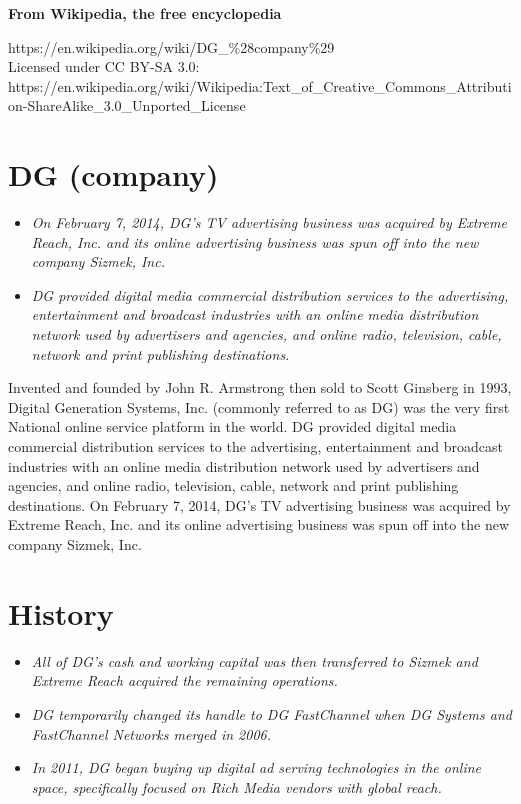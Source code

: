 \textbf{From Wikipedia, the free encyclopedia}

https://en.wikipedia.org/wiki/DG\_\%28company\%29\\
Licensed under CC BY-SA 3.0:\\
https://en.wikipedia.org/wiki/Wikipedia:Text\_of\_Creative\_Commons\_Attribution-ShareAlike\_3.0\_Unported\_License

\section{DG (company)}\label{dg-company}

\begin{itemize}
\item
  \emph{On February 7, 2014, DG's TV advertising business was acquired
  by Extreme Reach, Inc. and its online advertising business was spun
  off into the new company Sizmek, Inc.}
\item
  \emph{DG provided digital media commercial distribution services to
  the advertising, entertainment and broadcast industries with an online
  media distribution network used by advertisers and agencies, and
  online radio, television, cable, network and print publishing
  destinations.}
\end{itemize}

Invented and founded by John R. Armstrong then sold to Scott Ginsberg in
1993, Digital Generation Systems, Inc. (commonly referred to as DG) was
the very first National online service platform in the world. DG
provided digital media commercial distribution services to the
advertising, entertainment and broadcast industries with an online media
distribution network used by advertisers and agencies, and online radio,
television, cable, network and print publishing destinations. On
February 7, 2014, DG's TV advertising business was acquired by Extreme
Reach, Inc. and its online advertising business was spun off into the
new company Sizmek, Inc.

\section{History}\label{history}

\begin{itemize}
\item
  \emph{All of DG's cash and working capital was then transferred to
  Sizmek and Extreme Reach acquired the remaining operations.}
\item
  \emph{DG temporarily changed its handle to DG FastChannel when DG
  Systems and FastChannel Networks merged in 2006.}
\item
  \emph{In 2011, DG began buying up digital ad serving technologies in
  the online space, specifically focused on Rich Media vendors with
  global reach.}
\end{itemize}

